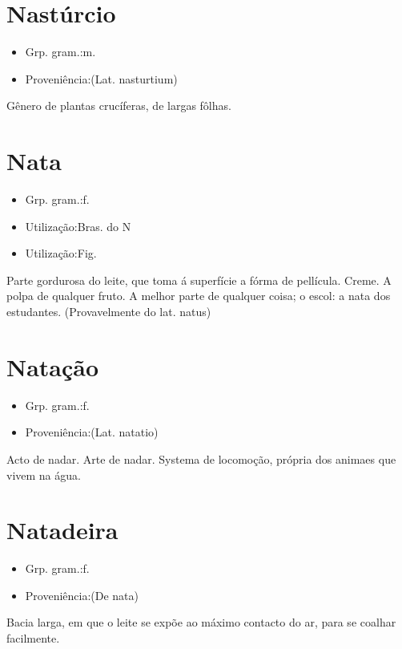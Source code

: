 \section{Nastúrcio}
\begin{itemize}
\item {Grp. gram.:m.}
\end{itemize}
\begin{itemize}
\item {Proveniência:(Lat. \textunderscore nasturtium\textunderscore )}
\end{itemize}
Gênero de plantas crucíferas, de largas fôlhas.
\section{Nata}
\begin{itemize}
\item {Grp. gram.:f.}
\end{itemize}
\begin{itemize}
\item {Utilização:Bras. do N}
\end{itemize}
\begin{itemize}
\item {Utilização:Fig.}
\end{itemize}
Parte gordurosa do leite, que toma á superfície a fórma de pellícula.
Creme.
A polpa de qualquer fruto.
A melhor parte de qualquer coisa; o escol: \textunderscore a nata dos estudantes\textunderscore .
(Provavelmente do lat. \textunderscore natus\textunderscore )
\section{Natação}
\begin{itemize}
\item {Grp. gram.:f.}
\end{itemize}
\begin{itemize}
\item {Proveniência:(Lat. \textunderscore natatio\textunderscore )}
\end{itemize}
Acto de nadar.
Arte de nadar.
Systema de locomoção, própria dos animaes que vivem na água.
\section{Natadeira}
\begin{itemize}
\item {Grp. gram.:f.}
\end{itemize}
\begin{itemize}
\item {Proveniência:(De \textunderscore nata\textunderscore )}
\end{itemize}
Bacia larga, em que o leite se expõe ao máximo contacto do ar, para se coalhar facilmente.
